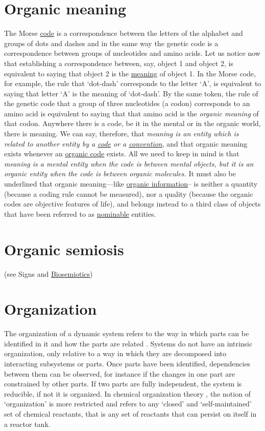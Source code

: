 \documentclass[12pt]{article}
\begin{document}
\section{Organic meaning}
The Morse \hyperlink{code}{code} is a correspondence between the letters of the alphabet and groups of dots and dashes and in the same way the genetic code is a correspondence between groups of nucleotides and amino acids. Let us notice now that establishing a correspondence between, say, object 1 and object 2, is equivalent to saying that object 2 is the \hyperlink{meaning}{meaning} of object 1. In the Morse code, for example, the rule that `dot-dash' corresponds to the letter `A', is equivalent to saying that letter `A' is the meaning of `dot-dash'. By the same token, the rule of the genetic code that a group of three nucleotides (a codon) corresponds to an amino acid is equivalent to saying that that amino acid is the \textit{organic meaning} of that codon. Anywhere there is a code, be it in the mental or in the organic world, there is meaning. We can say, therefore, that \textit{meaning is an entity which is related to another entity by a \hyperlink{code}{code} or a \hyperlink{convention}{convention}}, and that organic meaning exists whenever an \hyperlink{organic_codes}{organic code} exists. All we need to keep in mind is that \textit{meaning is a mental entity when the code is between mental objects, but it is an organic entity when the code is between organic molecules.} It must also be underlined that organic meaning---like \hyperlink{organic_information}{organic information}-- is neither a \hypertarget{physical_quantities}{quantity} (because a coding rule cannot be measured), nor a quality (because the organic codes are objective features of life), and belongs instead to a third class of objects that have been referred to as \hyperlink{nominable_entities}{nominable} entities.


\hypertarget{organic_semiosis}{}
\section{Organic semiosis} (see Signs and \hyperlink{biosemiotics}{Biosemiotics})

\hypertarget{organization}{}
\section{Organization} 
The organization of a dynamic system refers to the way in which parts
can be identified in it and how the parts are related
\cite{ashby62:_principles_self_organizing_system}.  Systems do not
have an intrinsic organization, only relative to a way in which they
are decomposed into interacting subsystems or parts. Once parts have
been identified, dependencies between them can be observed, for
instance if the changes in one part are constrained by other parts. If
two parts are fully independent, the system is reducible, if not it is
organized. In chemical organization theory
\cite{dittrich07:_chemic_organ_theor}, the notion of `organization' is
more restricted and refers to any `closed' and `self-maintained' set
of chemical reactants, that is any set of reactants that can persist
on itself in a reactor tank. 
\end{document}

